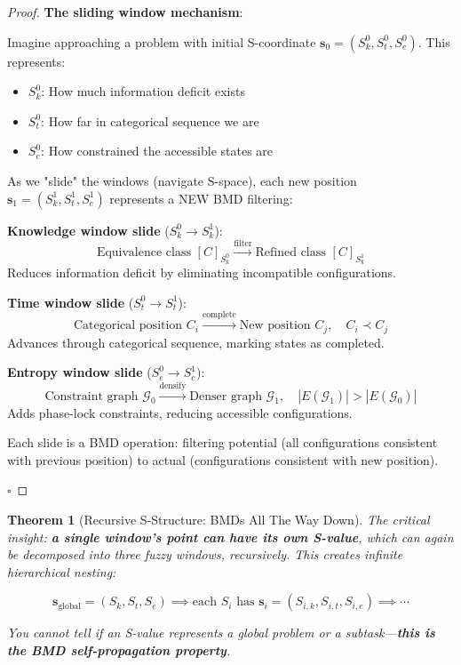 \documentclass[12pt,a4paper]{article}
\newtheorem{theorem}{Theorem}[section]
\begin{document}
\begin{proof}
\textbf{The sliding window mechanism}:

Imagine approaching a problem with initial S-coordinate $\mathbf{s}_0 = (S_k^0, S_t^0, S_e^0)$. This represents:
\begin{itemize}
\item $S_k^0$: How much information deficit exists
\item $S_t^0$: How far in categorical sequence we are
\item $S_e^0$: How constrained the accessible states are
\end{itemize}

As we "slide" the windows (navigate S-space), each new position $\mathbf{s}_1 = (S_k^1, S_t^1, S_e^1)$ represents a NEW BMD filtering:

\textbf{Knowledge window slide} ($S_k^0 \to S_k^1$):
\begin{equation}
\text{Equivalence class } [C]_{S_k^0} \xrightarrow{\text{filter}} \text{Refined class } [C]_{S_k^1}
\end{equation}
Reduces information deficit by eliminating incompatible configurations.

\textbf{Time window slide} ($S_t^0 \to S_t^1$):
\begin{equation}
\text{Categorical position } C_i \xrightarrow{\text{complete}} \text{New position } C_j, \quad C_i \prec C_j
\end{equation}
Advances through categorical sequence, marking states as completed.

\textbf{Entropy window slide} ($S_e^0 \to S_e^1$):
\begin{equation}
\text{Constraint graph } \mathcal{G}_0 \xrightarrow{\text{densify}} \text{Denser graph } \mathcal{G}_1, \quad |E(\mathcal{G}_1)| > |E(\mathcal{G}_0)|
\end{equation}
Adds phase-lock constraints, reducing accessible configurations.

Each slide is a BMD operation: filtering potential (all configurations consistent with previous position) to actual (configurations consistent with new position).

$\square$
\end{proof}

\begin{theorem}[Recursive S-Structure: BMDs All The Way Down]
\label{thm:recursive_bmds}
The critical insight: \textbf{a single window's point can have its own S-value}, which can again be decomposed into three fuzzy windows, recursively. This creates infinite hierarchical nesting:

\begin{equation}
\mathbf{s}_{\text{global}} = (S_k, S_t, S_e) \implies \text{each } S_i \text{ has } \mathbf{s}_i = (S_{i,k}, S_{i,t}, S_{i,e}) \implies \cdots
\end{equation}

You cannot tell if an S-value represents a global problem or a subtask—\textbf{this is the BMD self-propagation property}.
\end{theorem}
\end{document}
